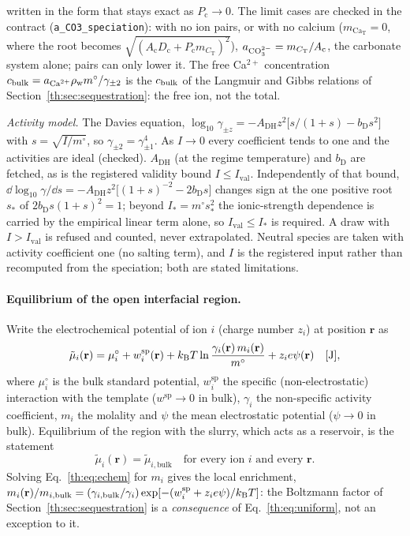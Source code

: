 written in the form that stays exact as $P_\mathrm{c}\to0$. The limit cases are checked in the
contract (\texttt{a\_CO3\_speciation}): with no ion pairs, or with no calcium
($m_{\mathrm{Ca}_\mathrm{T}}=0$, where the root becomes $\sqrt{(A_\mathrm{c}D_\mathrm{c}+P_\mathrm{c}m_{C_\mathrm{T}})^{2}}$),
$a_{\mathrm{CO}_3^{2-}}=m_{C_\mathrm{T}}/A_\mathrm{c}$, the carbonate system alone; pairs can only lower it. The free
Ca$^{2+}$ concentration $c_\mathrm{bulk}=a_{\mathrm{Ca}^{2+}}\rho_\mathrm{w}m^{\circ}/\gamma_{\pm2}$ is the $c_\mathrm{bulk}$ of the Langmuir and Gibbs
relations of Section~\ref{th:sec:sequestration}: the free ion, not the total.

\emph{Activity model.} The Davies equation,
$\log_{10}\gamma_{\pm z}=-A_\mathrm{DH}z^{2}\big[s/(1+s)-b_\mathrm{D}s^{2}\big]$ with $s=\sqrt{I/m^{\circ}}$,
so $\gamma_{\pm2}=\gamma_{\pm1}^{4}$. As $I\to0$ every coefficient tends to one and the activities are
ideal (checked). $A_\mathrm{DH}$ (at the regime temperature) and $b_\mathrm{D}$ are fetched, as is the
registered validity bound $I\le I_\mathrm{val}$. Independently of that bound,
$\dd\log_{10}\gamma/\dd s=-A_\mathrm{DH}z^{2}\big[(1+s)^{-2}-2b_\mathrm{D}s\big]$ changes sign at the one positive
root $s_*$ of $2b_\mathrm{D}s(1+s)^{2}=1$; beyond $I_*=m^{\circ}s_*^{2}$ the ionic-strength dependence is
carried by the empirical linear term alone, so $I_\mathrm{val}\le I_*$ is required. A draw with
$I>I_\mathrm{val}$ is refused and counted, never extrapolated. Neutral species are taken with
activity coefficient one (no salting term), and $I$ is the registered input rather than
recomputed from the speciation; both are stated limitations.

\paragraph{Equilibrium of the open interfacial region.} Write the electrochemical potential of ion
$i$ (charge number $z_i$) at position $\mathbf r$ as
\begin{equation}\label{th:eq:echem}
\tilde\mu_i(\mathbf r)=\mu_i^{\circ}+w_i^\mathrm{sp}(\mathbf r)+k_\mathrm{B} T\ln\frac{\gamma_i(\mathbf r)\,m_i(\mathbf r)}{m^{\circ}}+z_ie\psi(\mathbf r) \quad[\mathrm{J}],
\end{equation}
where $\mu_i^{\circ}$ is the bulk standard potential, $w_i^\mathrm{sp}$ the specific (non-electrostatic)
interaction with the template ($w^\mathrm{sp}\to0$ in bulk), $\gamma_i$ the non-specific activity
coefficient, $m_i$ the molality and $\psi$ the mean electrostatic potential ($\psi\to0$ in bulk).
Equilibrium of the region with the slurry, which acts as a reservoir, is the statement
\begin{equation}\label{th:eq:uniform}
\tilde\mu_i(\mathbf r)=\tilde\mu_{i,\mathrm{bulk}}\quad\text{for every ion }i\text{ and every }\mathbf r.
\end{equation}
Solving Eq.~\eqref{th:eq:echem} for $m_i$ gives the local enrichment,
$m_i(\mathbf r)/m_{i,\mathrm{bulk}}=(\gamma_{i,\mathrm{bulk}}/\gamma_i)\exp[-(w_i^\mathrm{sp}+z_ie\psi)/k_\mathrm{B} T]$:
the Boltzmann factor of Section~\ref{th:sec:sequestration} is a \emph{consequence} of
Eq.~\eqref{th:eq:uniform}, not an exception to it.

